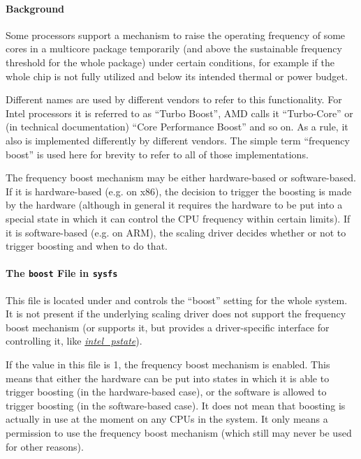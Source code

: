 \documentclass[a4paper,8pt,english]{sphinxmanual}
\begin{document}
\paragraph{Background}
\label{admin-guide/pm/cpufreq:background}
Some processors support a mechanism to raise the operating frequency of some
cores in a multicore package temporarily (and above the sustainable frequency
threshold for the whole package) under certain conditions, for example if the
whole chip is not fully utilized and below its intended thermal or power budget.

Different names are used by different vendors to refer to this functionality.
For Intel processors it is referred to as ``Turbo Boost'', AMD calls it
``Turbo-Core'' or (in technical documentation) ``Core Performance Boost'' and so on.
As a rule, it also is implemented differently by different vendors.  The simple
term ``frequency boost'' is used here for brevity to refer to all of those
implementations.

The frequency boost mechanism may be either hardware-based or software-based.
If it is hardware-based (e.g. on x86), the decision to trigger the boosting is
made by the hardware (although in general it requires the hardware to be put
into a special state in which it can control the CPU frequency within certain
limits).  If it is software-based (e.g. on ARM), the scaling driver decides
whether or not to trigger boosting and when to do that.


\paragraph{The \texttt{boost} File in \texttt{sysfs}}
\label{admin-guide/pm/cpufreq:the-boost-file-in-sysfs}
This file is located under  and controls
the ``boost'' setting for the whole system.  It is not present if the underlying
scaling driver does not support the frequency boost mechanism (or supports it,
but provides a driver-specific interface for controlling it, like
{\hyperref[admin\string-guide/pm/intel_pstate::doc]{\emph{\emph{intel\_pstate}}}}).

If the value in this file is 1, the frequency boost mechanism is enabled.  This
means that either the hardware can be put into states in which it is able to
trigger boosting (in the hardware-based case), or the software is allowed to
trigger boosting (in the software-based case).  It does not mean that boosting
is actually in use at the moment on any CPUs in the system.  It only means a
permission to use the frequency boost mechanism (which still may never be used
for other reasons).
\end{document}
